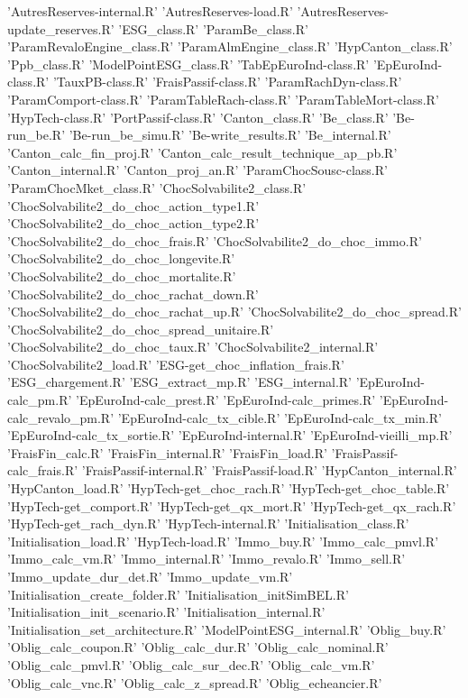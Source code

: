 \documentclass[a4paper]{book}
\begin{document}
\begin{description}
{'AutresReserves-internal.R' 'AutresReserves-load.R'
'AutresReserves-update\_reserves.R' 'ESG\_class.R'
'ParamBe\_class.R' 'ParamRevaloEngine\_class.R'
'ParamAlmEngine\_class.R' 'HypCanton\_class.R' 'Ppb\_class.R'
'ModelPointESG\_class.R' 'TabEpEuroInd-class.R'
'EpEuroInd-class.R' 'TauxPB-class.R' 'FraisPassif-class.R'
'ParamRachDyn-class.R' 'ParamComport-class.R'
'ParamTableRach-class.R' 'ParamTableMort-class.R'
'HypTech-class.R' 'PortPassif-class.R' 'Canton\_class.R'
'Be\_class.R' 'Be-run\_be.R' 'Be-run\_be\_simu.R'
'Be-write\_results.R' 'Be\_internal.R' 'Canton\_calc\_fin\_proj.R'
'Canton\_calc\_result\_technique\_ap\_pb.R' 'Canton\_internal.R'
'Canton\_proj\_an.R' 'ParamChocSousc-class.R'
'ParamChocMket\_class.R' 'ChocSolvabilite2\_class.R'
'ChocSolvabilite2\_do\_choc\_action\_type1.R'
'ChocSolvabilite2\_do\_choc\_action\_type2.R'
'ChocSolvabilite2\_do\_choc\_frais.R'
'ChocSolvabilite2\_do\_choc\_immo.R'
'ChocSolvabilite2\_do\_choc\_longevite.R'
'ChocSolvabilite2\_do\_choc\_mortalite.R'
'ChocSolvabilite2\_do\_choc\_rachat\_down.R'
'ChocSolvabilite2\_do\_choc\_rachat\_up.R'
'ChocSolvabilite2\_do\_choc\_spread.R'
'ChocSolvabilite2\_do\_choc\_spread\_unitaire.R'
'ChocSolvabilite2\_do\_choc\_taux.R' 'ChocSolvabilite2\_internal.R'
'ChocSolvabilite2\_load.R' 'ESG-get\_choc\_inflation\_frais.R'
'ESG\_chargement.R' 'ESG\_extract\_mp.R' 'ESG\_internal.R'
'EpEuroInd-calc\_pm.R' 'EpEuroInd-calc\_prest.R'
'EpEuroInd-calc\_primes.R' 'EpEuroInd-calc\_revalo\_pm.R'
'EpEuroInd-calc\_tx\_cible.R' 'EpEuroInd-calc\_tx\_min.R'
'EpEuroInd-calc\_tx\_sortie.R' 'EpEuroInd-internal.R'
'EpEuroInd-vieilli\_mp.R' 'FraisFin\_calc.R'
'FraisFin\_internal.R' 'FraisFin\_load.R'
'FraisPassif-calc\_frais.R' 'FraisPassif-internal.R'
'FraisPassif-load.R' 'HypCanton\_internal.R' 'HypCanton\_load.R'
'HypTech-get\_choc\_rach.R' 'HypTech-get\_choc\_table.R'
'HypTech-get\_comport.R' 'HypTech-get\_qx\_mort.R'
'HypTech-get\_qx\_rach.R' 'HypTech-get\_rach\_dyn.R'
'HypTech-internal.R' 'Initialisation\_class.R'
'Initialisation\_load.R' 'HypTech-load.R' 'Immo\_buy.R'
'Immo\_calc\_pmvl.R' 'Immo\_calc\_vm.R' 'Immo\_internal.R'
'Immo\_revalo.R' 'Immo\_sell.R' 'Immo\_update\_dur\_det.R'
'Immo\_update\_vm.R' 'Initialisation\_create\_folder.R'
'Initialisation\_initSimBEL.R' 'Initialisation\_init\_scenario.R'
'Initialisation\_internal.R' 'Initialisation\_set\_architecture.R'
'ModelPointESG\_internal.R' 'Oblig\_buy.R' 'Oblig\_calc\_coupon.R'
'Oblig\_calc\_dur.R' 'Oblig\_calc\_nominal.R' 'Oblig\_calc\_pmvl.R'
'Oblig\_calc\_sur\_dec.R' 'Oblig\_calc\_vm.R' 'Oblig\_calc\_vnc.R'
'Oblig\_calc\_z\_spread.R' 'Oblig\_echeancier.R'
}
\end{description}
\end{document}
